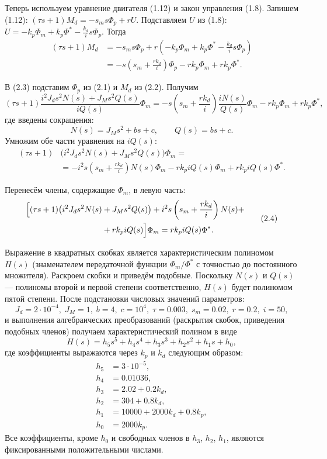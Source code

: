 \documentclass[a4paper, 14pt]{extarticle}
\begin{document}
    Теперь используем уравнение двигателя (1.12) и закон управления (1.8). Запишем (1.12): $(\tau s+1)M_d = -s_m s \Phi_p + r U$. Подставляем $U$ из (1.8): $U = -k_p \Phi_m + k_p \Phi^* - \frac{k_d}{i}s\Phi_p$. Тогда
\[
\begin{split}
(\tau s+1)M_d &= -s_m s \Phi_p + r\left(-k_p \Phi_m + k_p \Phi^* - \frac{k_d}{i}s\Phi_p\right) \\
&= -s\left(s_m + \frac{r k_d}{i}\right)\Phi_p - r k_p \Phi_m + r k_p \Phi^*.
\end{split}
\tag{2.3}
\]


    В (2.3) подставим $\Phi_p$ из (2.1) и $M_d$ из (2.2). Получим
    \[
    (\tau s+1)\frac{i^2 J_d s^2 N(s) + J_M s^2 Q(s)}{i Q(s)}\Phi_m = -s\left(s_m + \frac{r k_d}{i}\right)\frac{i N(s)}{Q(s)}\Phi_m - r k_p \Phi_m + r k_p \Phi^*,
    \]
    где введены сокращения:
    \[
    N(s) = J_M s^2 + bs + c,\qquad Q(s) = bs + c.
    \]
    Умножим обе части уравнения на $i Q(s)$:
\[
\begin{split}
(\tau s+1)&\bigl(i^2 J_d s^2 N(s) + J_M s^2 Q(s)\bigr)\Phi_m = \\
&= -i^2 s\left(s_m + \frac{r k_d}{i}\right)N(s)\Phi_m - r k_p i Q(s)\Phi_m + r k_p i Q(s)\Phi^*.
\end{split}
\]

    Перенесём члены, содержащие $\Phi_m$, в левую часть:
\begin{equation}
\begin{split}
\Bigl[ (\tau s+1)\bigl(i^2 J_d s^2 N(s) &+ J_M s^2 Q(s)\bigr) + i^2 s\left(s_m + \frac{r k_d}{i}\right)N(s) + \\
&+ r k_p i Q(s) \Bigr]\Phi_m = r k_p i Q(s)\Phi^*.
\end{split}
\tag{2.4}
\end{equation}


    Выражение в квадратных скобках является характеристическим полиномом $H(s)$ (знаменателем передаточной функции $\Phi_m/\Phi^*$ с точностью до постоянного множителя). Раскроем скобки и приведём подобные. Поскольку $N(s)$ и $Q(s)$ — полиномы второй и первой степени соответственно, $H(s)$ будет полиномом пятой степени. После подстановки числовых значений параметров:
    \[
    J_d = 2\cdot10^{-4},\; J_M = 1,\; b = 4,\; c = 10^4,\; \tau = 0.003,\; s_m = 0.02,\; r = 0.2,\; i = 50,
    \]
    и выполнения алгебраических преобразований (раскрытия скобок, приведения подобных членов) получаем характеристический полином в виде
    \[
    H(s) = h_5 s^5 + h_4 s^4 + h_3 s^3 + h_2 s^2 + h_1 s + h_0,
    \]
    где коэффициенты выражаются через $k_p$ и $k_d$ следующим образом:
    \begin{align}
    h_5 &= 3\cdot10^{-5}, \label{eq:h5}\\
    h_4 &= 0.01036, \label{eq:h4}\\
    h_3 &= 2.02 + 0.2 k_d, \label{eq:h3}\\
    h_2 &= 304 + 0.8 k_d, \label{eq:h2}\\
    h_1 &= 10000 + 2000 k_d + 0.8 k_p, \label{eq:h1}\\
    h_0 &= 2000 k_p. \label{eq:h0}
    \end{align}
    Все коэффициенты, кроме $h_0$ и свободных членов в $h_3$, $h_2$, $h_1$, являются фиксированными положительными числами.
\end{document}
